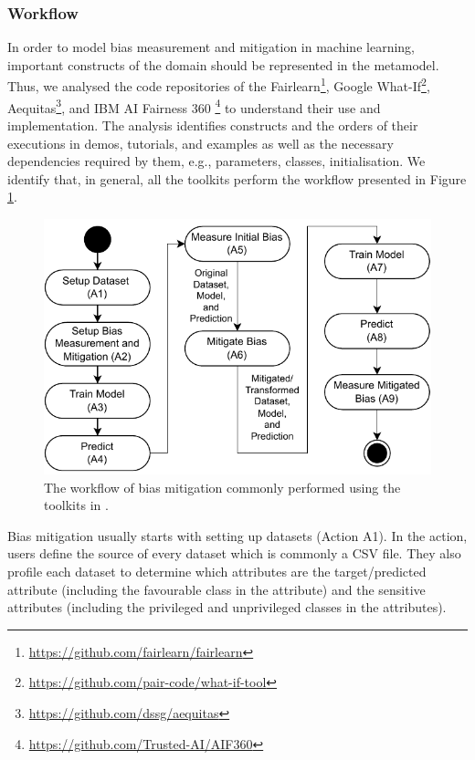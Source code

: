 \documentclass[final,5p,times,twocolumn]{elsarticle}
\begin{document}
\subsubsection{Workflow}
\label{sec:workflow}


In order to model bias measurement and mitigation in machine learning, important constructs of the domain should be represented in the metamodel. Thus, we analysed the code repositories of the Fairlearn\footnote{\url{https://github.com/fairlearn/fairlearn}}, 
Google What-If\footnote{\url{https://github.com/pair-code/what-if-tool}},
Aequitas\footnote{\url{https://github.com/dssg/aequitas}}, and 
IBM AI Fairness 360 \footnote{\url{https://github.com/Trusted-AI/AIF360}}
to understand their use and implementation. The analysis identifies constructs and  the orders of their executions in demos, tutorials, and examples as well as the necessary dependencies required by them, e.g., parameters, classes, initialisation.
We identify that, in general, all the toolkits perform the workflow presented in Figure \ref{fig:workflow}.
	
\begin{figure}
	\includegraphics[width=\linewidth]{figures/workflow}
	\caption{The workflow of bias mitigation commonly performed using the toolkits in .}
	\label{fig:workflow}
\end{figure}
	
Bias mitigation usually starts with setting up datasets (Action A1). In the action, users define the source of every dataset which is commonly a CSV file. They also profile each dataset to determine which attributes are the target/predicted attribute (including the favourable class in the attribute) and the sensitive attributes (including the privileged and unprivileged classes in the attributes).
\end{document}
